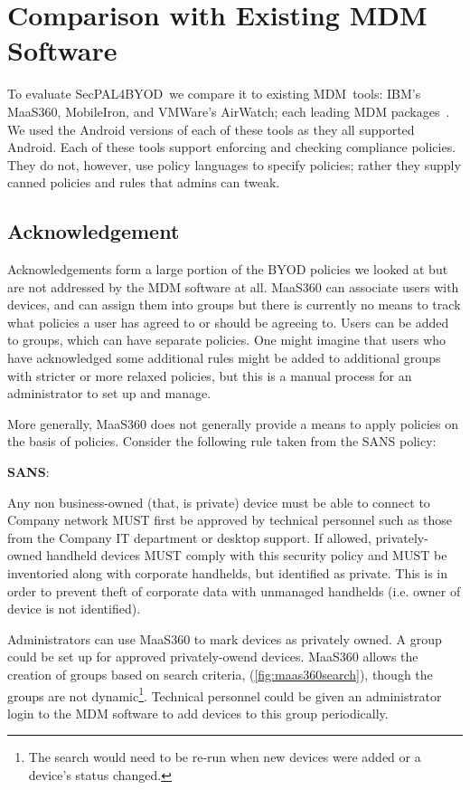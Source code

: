 \documentclass{llncs}
\newcommand{\AppPAL}[0]{SecPAL4BYOD}
\newenvironment{policyrule}[1]{%
  \begin{mdframed}\footnotesize
      \noindent\textbf{\sffamily #1}:~\itshape%
}{%
  \end{mdframed}
}
\begin{document}
\section{Comparison with Existing MDM Software}

To evaluate \AppPAL~we compare it to existing MDM~tools: IBM's MaaS360, MobileIron, and VMWare's AirWatch; each leading MDM packages~\cite{rob_smith_magic_2016}.
We used the Android versions of each of these tools as they all supported Android.
Each of these tools support enforcing and checking compliance policies. 
They do not, however, use policy languages to specify policies; rather they supply canned policies and rules that admins can tweak.


\subsection{Acknowledgement}

Acknowledgements form a large portion of the BYOD policies we looked at but are not addressed by the MDM software at all.
MaaS360 can associate users with devices, and can assign them into groups but there is currently no means to track what policies a user has agreed to or should be agreeing to.
Users can be added to groups, which can have separate policies.
One might imagine that users who have acknowledged some additional rules might be added to additional groups with stricter or more relaxed policies, but this is a manual process for an administrator to set up and manage.

More generally, MaaS360 does not generally provide a means to apply policies on the basis of policies.
Consider the following rule taken from the SANS policy:
\begin{policyrule}{SANS}
Any non business-owned (that, is private) device must be able to connect to Company network MUST first be approved by technical personnel such as those from the Company IT department or desktop support.
If allowed, privately-owned handheld devices MUST comply with this security policy and MUST be inventoried along with corporate handhelds, but identified as private. This is in order to prevent theft of corporate data with unmanaged handhelds (i.e. owner of device is not identified).
\end{policyrule}
Administrators can use MaaS360 to mark devices as privately owned.
A group could be set up for approved privately-owend devices.
MaaS360 allows the creation of groups based on search criteria, (\autoref{fig:maas360search}), though the groups are not dynamic\footnote{The search would need to be re-run when new devices were added or a device's status changed.}.
Technical personnel could be given an administrator login to the MDM software to add devices to this group periodically.
\end{document}
